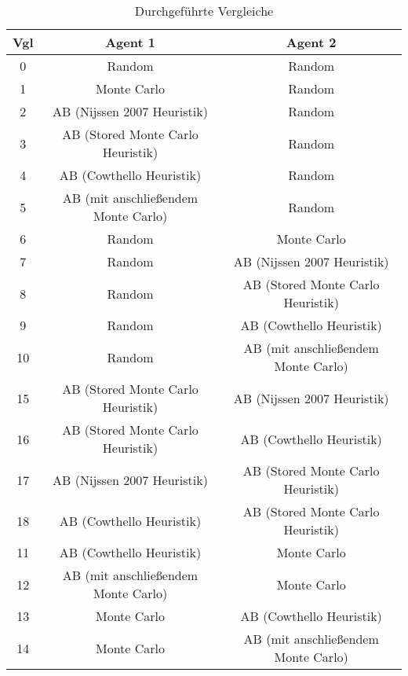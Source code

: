 \begin{table}[ht]
\begin{adjustbox}{max width=\textwidth}
\begin{tabular}{| c | c | c |} \hline
\acs{Vgl} & Agent 1 & Agent 2 \\ \hline
\hline
0  & Random                              & Random                              \\ \hline
\hline
 1 & Monte Carlo                         & Random                              \\ \hline
 2 & \ac{AB} (Nijssen 2007 Heuristik)         & Random                              \\ \hline
 3 & \ac{AB} (Stored Monte Carlo Heuristik)   & Random                              \\ \hline
 4 & \ac{AB} (Cowthello Heuristik)            & Random                              \\ \hline
 5 & \ac{AB} (mit anschließendem Monte Carlo) & Random                              \\ \hline
\hline
 6 & Random                              & Monte Carlo                         \\ \hline
 7 & Random                              & \ac{AB} (Nijssen 2007 Heuristik)         \\ \hline
 8 & Random                              & \ac{AB} (Stored Monte Carlo Heuristik)   \\ \hline
 9 & Random                              & \ac{AB} (Cowthello Heuristik)            \\ \hline
10 & Random                              & \ac{AB} (mit anschließendem Monte Carlo) \\ \hline
\hline
15 & \ac{AB} (Stored Monte Carlo Heuristik)   & \ac{AB} (Nijssen 2007 Heuristik)    \\ \hline
16 & \ac{AB} (Stored Monte Carlo Heuristik)   & \ac{AB} (Cowthello Heuristik)       \\ \hline
17 & \ac{AB} (Nijssen 2007 Heuristik)    & \ac{AB} (Stored Monte Carlo Heuristik)   \\ \hline
18 & \ac{AB} (Cowthello Heuristik)       & \ac{AB} (Stored Monte Carlo Heuristik)   \\ \hline
\hline
11 & \ac{AB} (Cowthello Heuristik)            & Monte Carlo                         \\ \hline
12 & \ac{AB} (mit anschließendem Monte Carlo) & Monte Carlo                         \\ \hline
13 & Monte Carlo                         & \ac{AB} (Cowthello Heuristik)            \\ \hline
14 & Monte Carlo                         & \ac{AB} (mit anschließendem Monte Carlo) \\ \hline
\end{tabular}
\end{adjustbox}
\caption{Durchgeführte Vergleiche}
\label{tbl:cmp-agents}
%
\end{table}

